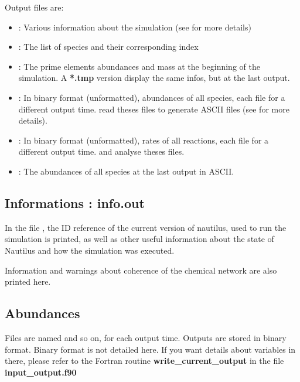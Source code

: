 \documentclass[english,a4paper,twoside]{article}
\begin{document}
Output files are:
\begin{itemize}
\item {}: Various information about the simulation (see  for more details)
\item {}: The list of species and their corresponding index
\item {}: The prime elements abundances and mass at the beginning of the simulation. A \textbf{*.tmp} version display the same infos, but at the last output.
\item {}: In binary format (unformatted), abundances of all species, each file for a different output time.  read theses files to generate ASCII files (see  for more details).
\item {}: In binary format (unformatted), rates of all reactions, each file for a different output time.  and  analyse theses files.
\item {}: The abundances of all species at the last output in ASCII.
\end{itemize}

\subsection{Informations : info.out}\label{sec:info-out}
In the file , the ID reference of the current version of nautilus, used to run the simulation is printed, as well as other useful information about the state of Nautilus and how the simulation was executed.

Information and warnings about coherence of the chemical network are also printed here.

\subsection{Abundances}\label{sec:abundances}
Files are named  and so on, for each output time. Outputs are stored in binary format. Binary format is not detailed here. If you want details about variables in there, please refer to the Fortran routine \textbf{write\_current\_output} in the file \textbf{input\_output.f90}
\end{document}
